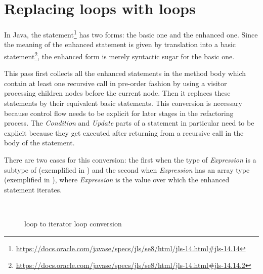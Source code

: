 \section{Replacing  loops with  loops}

In Java, the  statement\footnote{\url{https://docs.oracle.com/javase/specs/jls/se8/html/jls-14.html#jls-14.14}}
has two forms: the basic one and the enhanced one. Since the meaning of the enhanced  statement is given by
translation into a basic  statement\footnote{\url{https://docs.oracle.com/javase/specs/jls/se8/html/jls-14.html#jls-14.14.2}},
the enhanced form is merely syntactic sugar for the basic one.

This pass first collects all the enhanced  statements in the method body which contain at least one recursive
call in pre-order fashion by using a visitor processing children nodes before the current node. Then it replaces these
statements by their equivalent basic  statements. This conversion is necessary because control flow needs to
be explicit for later stages in the refactoring process. The \textit{Condition} and \textit{Update} parts of a 
statement in particular need to be explicit because they get executed after returning from a recursive call in the body
of the  statement.

There are two cases for this conversion: the first when the type of \textit{Expression} is a subtype of
 (exemplified in ) and the second when
\textit{Expression} has an array type  (exemplified in ),
where \textit{Expression} is the value over which the enhanced  statement iterates.

\begin{figure}[htb]
    \\
    \caption{ loop to iterator  loop conversion \label{img:foreach-to-iterator-for}}
\end{figure}

